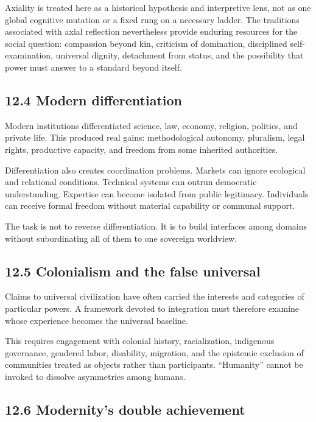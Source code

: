 \documentclass[
  11pt,
]{article}
\begin{document}
Axiality is treated here as a historical hypothesis and interpretive
lens, not as one global cognitive mutation or a fixed rung on a
necessary ladder. The traditions associated with axial reflection
nevertheless provide enduring resources for the social question:
compassion beyond kin, criticism of domination, disciplined
self-examination, universal dignity, detachment from status, and the
possibility that power must answer to a standard beyond itself.

\subsection{12.4 Modern differentiation}\label{modern-differentiation}

Modern institutions differentiated science, law, economy, religion,
politics, and private life. This produced real gains: methodological
autonomy, pluralism, legal rights, productive capacity, and freedom from
some inherited authorities.

Differentiation also creates coordination problems. Markets can ignore
ecological and relational conditions. Technical systems can outrun
democratic understanding. Expertise can become isolated from public
legitimacy. Individuals can receive formal freedom without material
capability or communal support.

The task is not to reverse differentiation. It is to build interfaces
among domains without subordinating all of them to one sovereign
worldview.

\subsection{12.5 Colonialism and the false
universal}\label{colonialism-and-the-false-universal}

Claims to universal civilization have often carried the interests and
categories of particular powers. A framework devoted to integration must
therefore examine whose experience becomes the universal baseline.

This requires engagement with colonial history, racialization,
indigenous governance, gendered labor, disability, migration, and the
epistemic exclusion of communities treated as objects rather than
participants. ``Humanity'' cannot be invoked to dissolve asymmetries
among humans.

\subsection{12.6 Modernity's double
achievement}\label{modernitys-double-achievement}
\end{document}

